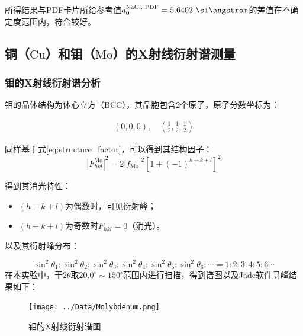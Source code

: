 \documentclass{thuemp}
\begin{document}
所得结果与PDF卡片所给参考值$a_0^{\text{NaCl, PDF}} = 5.6402~\text{\si\angstrom}$的差值在不确定度范围内，符合较好。

\subsection{铜（$\text{Cu}$）和钼（$\text{Mo}$）的X射线衍射谱测量}

\subsubsection{钼的X射线衍射谱分析}

钼的晶体结构为体心立方（BCC），其晶胞包含2个原子，原子分数坐标为：

\begin{align*}
(0,0,0),\quad \left(\frac{1}{2},\frac{1}{2},\frac{1}{2}\right)
\end{align*}

同样基于式\ref{eq:structure_factor}，可以得到其结构因子：
\begin{equation}
    |F_{hkl}^{\text{Mo}}|^2 = 2|f_{\text{Mo}}|^2 \left[1+(-1)^{h+k+l}\right]^2
    \label{eq:mo_struct_fac}
\end{equation}

得到其消光特性：

\begin{itemize}
    \item $(h+k+l)$为偶数时，可见衍射峰；
    \item $(h+k+l)$为奇数时$F_{hkl}=0$（消光）。
\end{itemize}

以及其衍射峰分布：

\begin{equation}
    \sin^2\theta_1 : \sin^2\theta_2: \sin^2\theta_3 : \sin^2\theta_4 : \sin^2\theta_5 : \sin^2\theta_6 : \cdots =
    1 : 2 : 3 : 4 : 5 : 6 \cdots
    \label{eq:mo_diff_patt}
\end{equation}
在本实验中，于$2\theta$取$20.0^\circ \sim 150^\circ$范围内进行扫描，得到谱图以及Jade软件寻峰结果如下：

\begin{figure}[H]
    \centering
    \texttt{[image: ../Data/Molybdenum.png]}
    \caption{钼的X射线衍射谱图}
    \label{fig:mo_xrd}
\end{figure}
\end{document}
